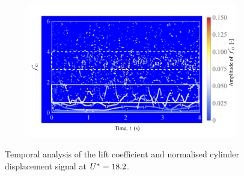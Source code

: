 \documentclass[oneside]{utmthesis}
\begin{document}
\begin{figure} \continuedfloat
  \centering
  \begin{subfigure}[h]{1\textwidth}
    \includegraphics[width=\textwidth]{figs/tempAnalysisStableInitialBranch-c}
    \caption{}
    \label{fig:tempAnalysisStableInitialBranch-c}
  \end{subfigure}
  \caption{Temporal analysis of the lift coefficient and normalised cylinder displacement signal at $U^{*} = 18.2$.}
  \label{fig:tempAnalysisStableInitialBranch}
\end{figure}
\end{document}
